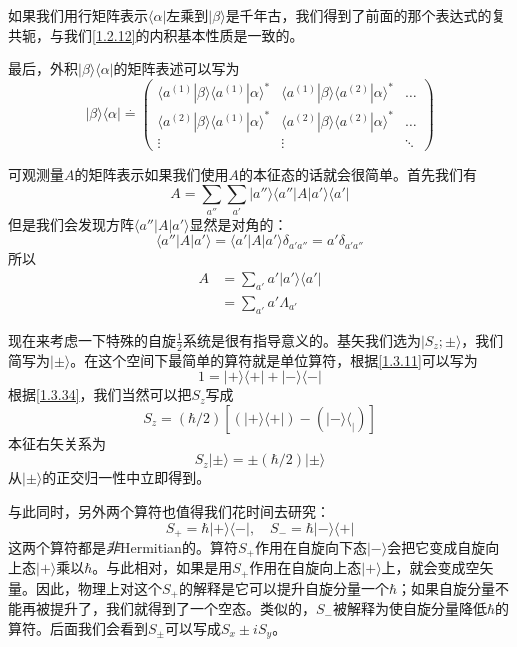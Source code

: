 \documentclass[UTF8,twoside]{ctexart}
\def\be{\begin{equation}}
\def\ee{\end{equation}}
\begin{document}
如果我们用行矩阵表示$\langle\alpha|$左乘到$|\beta\rangle$是千年古，我们得到了前面的那个表达式的复共轭，与我们\eqref{1.2.12}的内积基本性质是一致的。

\noindent 最后，外积$|\beta\rangle\langle\alpha|$的矩阵表述可以写为
\be
|\beta\rangle\langle\alpha|\overset{\cdot}{=}\left(\begin{matrix}
\langle a^{(1)}|\beta\rangle\langle a^{(1)}|\alpha\rangle^* & \langle a^{(1)}|\beta\rangle\langle a^{(2)}|\alpha\rangle^* & \ldots\\
\langle a^{(2)}|\beta\rangle\langle a^{(1)}|\alpha\rangle^* & \langle a^{(2)}|\beta\rangle\langle a^{(2)}|\alpha\rangle^* & \ldots\\
\vdots & \vdots & \ddots
\end{matrix}\right)
\ee

可观测量$A$的矩阵表示如果我们使用$A$的本征态的话就会很简单。首先我们有
\be
A = \sum_{a''}\sum_{a'}|a''\rangle\langle a''|A|a'\rangle\langle a'|
\ee
但是我们会发现方阵$\langle a''|A|a'\rangle$显然是对角的：
\be
\langle a''|A|a'\rangle = \langle a'|A|a'\rangle\delta_{a'a''} = a'\delta_{a'a''}
\ee
所以
\be\label{1.3.34}\begin{split}
A&=\sum_{a'}a'|a'\rangle\langle a'|\\
&=\sum_{a'}a'\Lambda_{a'}
\end{split}\ee


现在来考虑一下特殊的自旋$\frac{1}{2}$系统是很有指导意义的。基矢我们选为$|S_z;\pm\rangle$，我们简写为$|\pm\rangle$。在这个空间下最简单的算符就是单位算符，根据\eqref{1.3.11}可以写为
\be
1 = |+\rangle\langle+|+|-\rangle\langle-|
\ee
根据\eqref{1.3.34}，我们当然可以把$S_z$写成
\be
S_z = (\hbar/2)[(|+\rangle\langle+|)-(|-\rangle\langle_|)]
\ee
本征右矢关系为
\be
S_z|\pm\rangle = \pm(\hbar/2)|\pm\rangle
\ee
从$|\pm\rangle$的正交归一性中立即得到。

与此同时，另外两个算符也值得我们花时间去研究：
\be
S_+ = \hbar|+\rangle\langle-|,\quad S_- = \hbar|-\rangle\langle+|
\ee
这两个算符都是{\it 非}Hermitian的。算符$S_+$作用在自旋向下态$|-\rangle$会把它变成自旋向上态$|+\rangle$乘以$\hbar$。与此相对，如果是用$S_+$作用在自旋向上态$|+\rangle$上，就会变成空矢量。因此，物理上对这个$S_+$的解释是它可以提升自旋分量一个$\hbar$；如果自旋分量不能再被提升了，我们就得到了一个空态。类似的，$S_-$被解释为使自旋分量降低$\hbar$的算符。后面我们会看到$S_\pm$可以写成$S_x\pm iS_y$。
\end{document}
